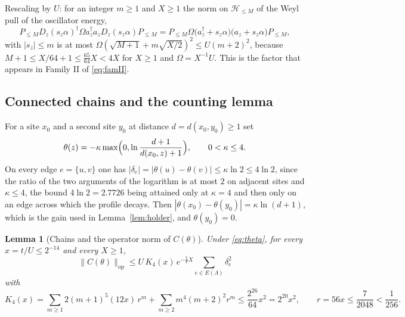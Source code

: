 \documentclass[11pt]{article}
\theoremstyle{plain}
\newtheorem{lemma}{Lemma}
\theoremstyle{definition}
\begin{document}
Rescaling by $U$: for an integer $m\ge1$ and $X\ge1$ the norm on
$\mathcal{H}_{\le M}$ of the Weyl pull of the oscillator energy,
\begin{equation}\label{eq:phpull}
P_{\le M}D_z(s_z\alpha)^\dagger\Omega a_z^\dagger a_zD_z(s_z\alpha)P_{\le M}
=P_{\le M}\Omega\bigl(a_z^\dagger+s_z\alpha\bigr)\bigl(a_z+s_z\alpha\bigr)P_{\le M},
\end{equation}
with $|s_z|\le m$ is at most $\Omega(\sqrt{M+1}+m\sqrt{X/2})^{2}\le U(m+2)^{2}$,
because $M+1\le X/64+1\le\frac{65}{64}X<4X$ for $X\ge1$ and $\Omega=X^{-1}U$.
This is the factor that appears in Family II of \eqref{eq:famII}.

\subsection{Connected chains and the counting lemma}

For a site $x_0$ and a second site $y_0$ at distance $d=d(x_0,y_0)\ge1$ set
\begin{equation}\label{eq:theta}
\theta(z)=-\kappa\max\Bigl(0,\ln\frac{d+1}{d(x_0,z)+1}\Bigr),\qquad 0<\kappa\le4 .
\end{equation}
On every edge $e=\{u,v\}$ one has
$|\delta_e|=|\theta(u)-\theta(v)|\le\kappa\ln2\le4\ln2$, since the ratio of the two
arguments of the logarithm is at most $2$ on adjacent sites and $\kappa\le4$, the
bound $4\ln2=2.7726$ being attained only at $\kappa=4$ and then only on an edge
across which the profile decays. Then $|\theta(x_0)-\theta(y_0)|=\kappa\ln(d+1)$, which is the gain used
in Lemma~\ref{lem:holder}, and $\theta(y_0)=0$.

\begin{lemma}[Chains and the operator norm of $C(\theta)$]\label{lem:clusters}
Under \eqref{eq:theta}, for every $x=t/U\le2^{-14}$ and every $X\ge1$,
\begin{equation}\label{eq:K4}
\bigl\|C(\theta)\bigr\|_{\mathrm{op}}
\le U\,K_4(x)\,e^{-\frac78X}\sum_{e\in E(\Lambda)}\delta_e^{2}
\end{equation}
with
\begin{equation}\label{eq:K4def}
K_4(x)=\sum_{m\ge1}2(m+1)^{5}(12x)\,r^{m}+\sum_{m\ge2}m^{4}(m+2)^{2}r^{m}
\le\frac{2^{26}}{64}x^{2}=2^{20}x^{2},\qquad r=56x\le\frac7{2048}<\frac1{256} .
\end{equation}
\end{lemma}
\end{document}
